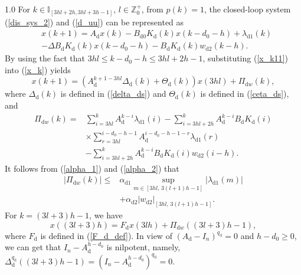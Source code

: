 \documentclass[journal]{IEEEtran}
\begin{document}
\begin{spacing}{1.0}
For $k\in\mathbb{I}_{[3hl+2h,3hl+3h-1]}$, $l\in%
\mathbb{Z}
_{0}^{+}$, from $p(k)=1$, the closed-loop system (\ref{dis_sys_2}) and
(\ref{d_uu}) can be represented as
\begin{align}
  &x(k+1)=  A_{\mathrm{d}}x(k)-B_{\mathrm{d}0}K_{\mathrm{d}}(k)x(k-d_{0}%
-h)+\lambda_{\mathrm{d}1}(k)\nonumber\\
&  -\mathit{\Delta}B_{\mathrm{d}}K_{\mathrm{d}}(k)x(k-d_{0}-h) -B_{\mathrm{d}}K_{\mathrm{d}}(k)w_{\mathrm{d}%
2}(k-h). \label{x_k}%
\end{align}
By using the fact that $3hl\leq k-d_{0}-h\leq3hl+2h-1$, substituting
(\ref{x_k11}) into (\ref{x_k}) yields
\begin{equation}
x(k+1)=(  A_{\mathrm{d}}^{k+1-3hl}\mathit{\Delta}_{\mathrm{d}%
}(k)+\mathit{\Theta}_{\mathrm{d}}(k))  x(3hl)+\mathit{\Pi}_{\mathrm{d}%
w}(k), \label{x_k_1_2}%
\end{equation}
where $\mathit{\Delta}_{\mathrm{d}}(k)$ is defined in (\ref{delta_ds}) and
$\mathit{\Theta}_{\mathrm{d}}(k)$ is defined in (\ref{ceta_ds}), and
\begin{align*}
\mathit{\Pi}_{\mathrm{d}w}(k)=  &
{\displaystyle\sum_{i=3hl}^{k}}
A_{\mathrm{d}}^{k-i}\lambda_{\mathrm{d}1}(i)-%
{\displaystyle\sum_{i=3hl+2h}^{k}}
A_{\mathrm{d}}^{k-i}B_{\mathrm{d}}K_{\mathrm{d}}(i)\\
&  \times%
{\displaystyle\sum_{r=3hl}^{i-d_{0}-h-1}}
A_{\mathrm{d}}^{i-d_{0}-h-1-r}\lambda_{\mathrm{d}1}(r)\\
&  -%
{\displaystyle\sum_{i=3hl+2h}^{k}}
A_{\mathrm{d}}^{k-i}B_{\mathrm{d}}K_{\mathrm{d}}(i)w_{\mathrm{d}2}(i-h).
\end{align*}
It follows from (\ref{alpha_1}) and (\ref{alpha_2}) that
\begin{align}
\left|\mathit{\Pi}_{\mathrm{d}w}(k)\right|
\leq{}&
\alpha_{\mathrm{d}1}
\sup_{m\in[3hl,\,3(l+1)h-1]}
\left|\lambda_{\mathrm{d}1}(m)\right|
\nonumber\\
&+
\alpha_{\mathrm{d}2}
\left|w_{\mathrm{d}2}\right|_{[3hl,\,3(l+1)h-1]}.
\end{align}
For $k=(3l+3)h-1$, we have
\begin{equation}
x((3l+3)h)=F_{\mathrm{d}}x(3lh)+\mathit{\Pi_{\mathrm{d}w}}((3l+3)h-1),
\label{x_3lh}%
\end{equation}
where $F_{\mathrm{d}}$ is defined in (\ref{F_d_def}). In view of
$(A_{\mathrm{d}}-I_{n})^{q_{\mathrm{d}}}=0$ and $h-d_{0}\geq0$, we can get that $I_{n}-A_{\mathrm{d}}^{h-d_{0}}$ is nilpotent, namely,
$\mathit{\Delta}_{\mathrm{d}}^{q_{\mathrm{d}}}((3l+3)h-1)=(I_{n}-A_{\mathrm{d}}^{h-d_{0}%
})^{q_{\mathrm{d}}}=0$.



\end{spacing}
\end{document}
